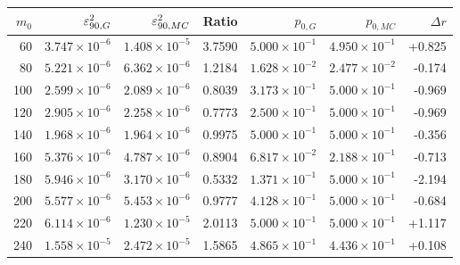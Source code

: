 \begin{tabular}{rrrrrrr}
\toprule
$m_0$ & $\varepsilon^2_{90,G}$ & $\varepsilon^2_{90,MC}$ & Ratio & $p_{0,G}$ & $p_{0,MC}$ & $\Delta r$ \\
\midrule
60 & $3.747\times10^{-6}$ & $1.408\times10^{-5}$ & 3.7590 & $5.000\times10^{-1}$ & $4.950\times10^{-1}$ & +0.825 \\
80 & $5.221\times10^{-6}$ & $6.362\times10^{-6}$ & 1.2184 & $1.628\times10^{-2}$ & $2.477\times10^{-2}$ & -0.174 \\
100 & $2.599\times10^{-6}$ & $2.089\times10^{-6}$ & 0.8039 & $3.173\times10^{-1}$ & $5.000\times10^{-1}$ & -0.969 \\
120 & $2.905\times10^{-6}$ & $2.258\times10^{-6}$ & 0.7773 & $2.500\times10^{-1}$ & $5.000\times10^{-1}$ & -0.969 \\
140 & $1.968\times10^{-6}$ & $1.964\times10^{-6}$ & 0.9975 & $5.000\times10^{-1}$ & $5.000\times10^{-1}$ & -0.356 \\
160 & $5.376\times10^{-6}$ & $4.787\times10^{-6}$ & 0.8904 & $6.817\times10^{-2}$ & $2.188\times10^{-1}$ & -0.713 \\
180 & $5.946\times10^{-6}$ & $3.170\times10^{-6}$ & 0.5332 & $1.371\times10^{-1}$ & $5.000\times10^{-1}$ & -2.194 \\
200 & $5.577\times10^{-6}$ & $5.453\times10^{-6}$ & 0.9777 & $4.128\times10^{-1}$ & $5.000\times10^{-1}$ & -0.684 \\
220 & $6.114\times10^{-6}$ & $1.230\times10^{-5}$ & 2.0113 & $5.000\times10^{-1}$ & $5.000\times10^{-1}$ & +1.117 \\
240 & $1.558\times10^{-5}$ & $2.472\times10^{-5}$ & 1.5865 & $4.865\times10^{-1}$ & $4.436\times10^{-1}$ & +0.108 \\
\bottomrule
\end{tabular}
